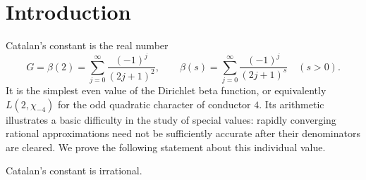 \section{Introduction}\label{sec:introduction}

Catalan's constant is the real number
\[
G=\beta(2)=\sum_{j=0}^{\infty}\frac{(-1)^j}{(2j+1)^2},
\qquad
\beta(s)=\sum_{j=0}^{\infty}\frac{(-1)^j}{(2j+1)^s}\quad(s>0).
\]
It is the simplest even value of the Dirichlet beta function, or
equivalently $L(2,\chi_{-4})$ for the odd quadratic character of
conductor $4$. Its arithmetic illustrates a basic difficulty in the
study of special values: rapidly converging rational approximations
need not be sufficiently accurate after their denominators are cleared.
We prove the following statement about this individual value.

\begin{theorem}\label{thm:main}
Catalan's constant is irrational.
\end{theorem}
